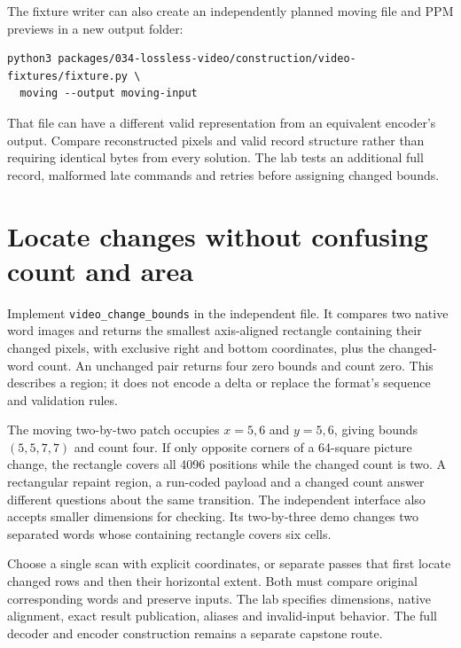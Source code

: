 The fixture writer can also create an independently planned moving file and
PPM previews in a new output folder:
\begin{Verbatim}
python3 packages/034-lossless-video/construction/video-fixtures/fixture.py \
  moving --output moving-input
\end{Verbatim}
That file can have a different valid representation from an equivalent encoder's
output. Compare reconstructed pixels and valid record structure rather than
requiring identical bytes from every solution. The lab tests an additional full
record, malformed late commands and retries before assigning changed bounds.

\section{Locate changes without confusing count and area}

Implement \texttt{video\_change\_bounds} in the independent file. It compares
two native word images and returns the smallest axis-aligned rectangle
containing their changed pixels, with exclusive right and bottom coordinates,
plus the changed-word count. An unchanged pair returns four zero bounds and
count zero. This describes a region; it does not encode a delta or replace the
format's sequence and validation rules.

The moving two-by-two patch occupies $x=5,6$ and $y=5,6$, giving bounds
$(5,5,7,7)$ and count four. If only opposite corners of a 64-square picture
change, the rectangle covers all 4096 positions while the changed count is two.
A rectangular repaint region, a run-coded payload and a changed count answer
different questions about the same transition. The independent interface also
accepts smaller dimensions for checking. Its two-by-three demo changes two
separated words whose containing rectangle covers six cells.


Choose a single scan with explicit coordinates, or separate passes that first
locate changed rows and then their horizontal extent. Both must compare original
corresponding words and preserve inputs. The lab specifies dimensions, native
alignment, exact result publication, aliases and invalid-input behavior. The
full decoder and encoder construction remains a separate capstone route.
